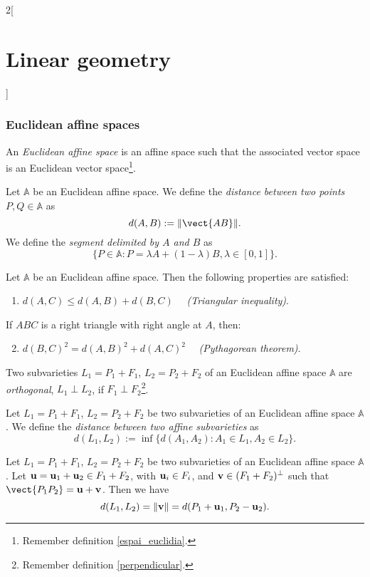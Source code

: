\documentclass[../../../main.tex]{subfiles}
\begin{document}
\begin{multicols}{2}[\section{Linear geometry}]
    \subsubsection*{Euclidean affine spaces}
    \begin{definition}
        An \textit{Euclidean affine space} is an affine space such that the associated vector space is an Euclidean vector space\footnote{Remember definition \ref{espai_euclidia}.}.
    \end{definition}
    \begin{definition}
        Let $\mathbb{A}$ be an Euclidean affine space. We define the \textit{distance between two points $P,Q\in\mathbb{A}$} as $$d(A,B):=\|\vect{AB}\|.$$ We define the \textit{segment delimited by $A$ and $B$} as $$\{P\in\mathbb{A}:P=\lambda A+(1-\lambda)B,\lambda\in[0,1]\}.$$
    \end{definition}
    \begin{prop}
        Let $\mathbb{A}$ be an Euclidean affine space. Then the following properties are satisfied:
        \begin{enumerate}
            \item $d(A,C)\leq d(A,B)+d(B,C)\quad$ \textit{(Triangular inequality)}.
        \end{enumerate}
        If $ABC$ is a right triangle with right angle at $A$, then:
        \begin{enumerate}
            \setcounter{enumi}{1}
            \item $d(B,C)^2=d(A,B)^2+d(A,C)^2\quad$ \textit{(Pythagorean theorem)}.
        \end{enumerate}
    \end{prop}
    \begin{definition}
        Two subvarieties $L_1=P_1+F_1$, $L_2=P_2+F_2$ of an Euclidean affine space $\mathbb{A}$ are \textit{orthogonal}, $L_1\perp L_2$, if $F_1\perp F_2$\footnote{Remember definition \ref{perpendicular}.}.
    \end{definition}
    \begin{definition}
        Let $L_1=P_1+F_1$, $L_2=P_2+F_2$ be two subvarieties of an Euclidean affine space $\mathbb{A}$. We define the \textit{distance between two affine subvarieties} as $$d(L_1,L_2):=\inf\{d(A_1,A_2):A_1\in L_1, A_2\in L_2\}.$$
    \end{definition}
    \begin{theorem}
        Let $L_1=P_1+F_1$, $L_2=P_2+F_2$ be two subvarieties of an Euclidean affine space $\mathbb{A}$. Let $\boldsymbol{\mathrm{u}}=\boldsymbol{\mathrm{u}}_1+\boldsymbol{\mathrm{u}}_2\in F_1+F_2$, with $\boldsymbol{\mathrm{u}}_i\in F_i$, and $\boldsymbol{\mathrm{v}}\in(F_1+F_2)^\perp$ such that $\vect{P_1P_2}=\vectorfunction{u}+\vectorfunction{v}$. Then we have $$d(L_1,L_2)=\|\boldsymbol{\mathrm{v}}\|=d(P_1+\boldsymbol{\mathrm{u}}_1,P_2-\boldsymbol{\mathrm{u}}_2).$$
    \end{theorem}

\end{multicols}
\end{document}
